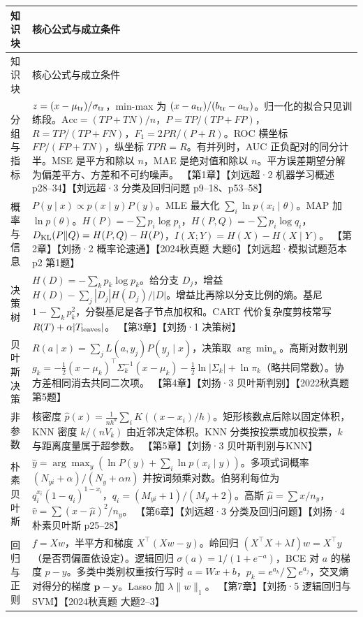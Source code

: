 \documentclass[UTF8,a4paper,zihao=-4,fontset=fandol]{ctexrep}
\begin{document}
\begin{longtable}{@{}p{.19\linewidth}p{.76\linewidth}@{}}
\toprule
知识块 & 核心公式与成立条件\\
\midrule
\endfirsthead
\toprule 知识块 & 核心公式与成立条件\\ \midrule
\endhead
\bottomrule
\endfoot
分组与指标 & $z=(x-\mu_{\rm tr})/\sigma_{\rm tr}$，min-max 为 $(x-a_{\rm tr})/(b_{\rm tr}-a_{\rm tr})$。归一化的拟合只见训练段。$\mathrm{Acc}=(TP+TN)/n$，$P=TP/(TP+FP)$，$R=TP/(TP+FN)$，$F_1=2PR/(P+R)$。ROC 横坐标 $FP/(FP+TN)$，纵坐标 $TPR=R$。有并列时，AUC 正负配对的同分计半。MSE 是平方和除以 $n$，MAE 是绝对值和除以 $n$。平方误差期望分解为偏差平方、方差和不可约噪声。 【第1章】【刘远超·2 机器学习概述 p28–34】【刘远超·3 分类及回归问题 p9–18、p53–58】\\[.4em]
概率与信息 & $P(y\mid x)\propto p(x\mid y)P(y)$。MLE 最大化 $\sum_i\ln p(x_i\mid\theta)$。MAP 加 $\ln p(\theta)$。$H(P)=-\sum p_i\log p_i$，$H(P,Q)=-\sum p_i\log q_i$，$D_{\rm KL}(P\Vert Q)=H(P,Q)-H(P)$，$I(X;Y)=H(X)-H(X\mid Y)$。 【第2章】【刘扬·2 概率论速通】【2024秋真题 大题6】【刘远超·模拟试题范本 p2 第1题】\\[.4em]
决策树 & $H(D)=-\sum_kp_k\log p_k$。给分支 $D_j$，增益 $H(D)-\sum_j|D_j|H(D_j)/|D|$。增益比再除以分支比例的熵。基尼 $1-\sum_kp_k^2$，分裂基尼是各子节点加权和。CART 代价复杂度剪枝常写 $R(T)+\alpha|T_{\rm leaves}|$。 【第3章】【刘扬·1 决策树】\\[.4em]
贝叶斯决策 & $R(a\mid x)=\sum_jL(a,y_j)P(y_j\mid x)$，决策取 $\arg\min_a$。高斯对数判别 $g_k=-\tfrac12(x-\mu_k)^\top\Sigma_k^{-1}(x-\mu_k)-\tfrac12\ln|\Sigma_k|+\ln\pi_k$（略共同常数）。协方差相同消去共同二次项。 【第4章】【刘扬·3 贝叶斯判别】【2022秋真题 第5题】\\[.4em]
非参数 & 核密度 $\hat p(x)=\frac1{nh^d}\sum_iK((x-x_i)/h)$。矩形核数点后除以固定体积，KNN 密度 $k/(nV_k)$ 由近邻决定体积。KNN 分类按投票或加权投票，$k$ 与距离度量属于超参数。 【第5章】【刘扬·3 贝叶斯判别与KNN】\\[.4em]
朴素贝叶斯 & $\hat y=\arg\max_y(\ln P(y)+\sum_i\ln p(x_i\mid y))$。多项式词概率 $(N_{yi}+\alpha)/(N_y+\alpha n)$ 并按词频乘对数。伯努利每位为 $q_i^{x_i}(1-q_i)^{1-x_i}$，$q_i=(M_{yi}+1)/(M_y+2)$。高斯 $\hat\mu=\sum x/n_y$，$\hat v=\sum(x-\hat\mu)^2/n_y$。 【第6章】【刘远超·3 分类及回归问题】【刘扬·4 朴素贝叶斯 p25–28】\\[.4em]
回归与正则 & $f=Xw$，半平方和梯度 $X^\top(Xw-y)$。岭回归 $(X^\top X+\lambda I)w=X^\top y$（是否罚偏置依设定）。逻辑回归 $\sigma(a)=1/(1+e^{-a})$，BCE 对 $a$ 的梯度 $p-y$。多类中类别权重按行写时 $a=Wx+b$，$p_k=e^{a_k}/\sum e^{a_j}$，交叉熵对得分的梯度 $\bm p-\bm y$。Lasso 加 $\lambda\|w\|_1$。 【第7章】【刘扬·5 逻辑回归与SVM】【2024秋真题 大题2–3】\\[.4em]

\end{longtable}
\end{document}
